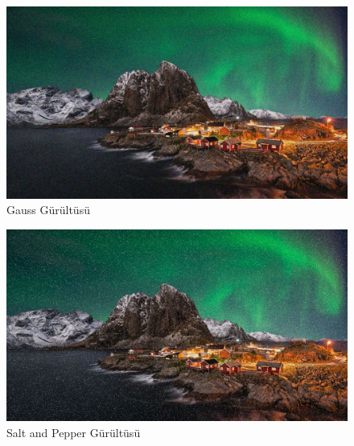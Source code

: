\documentclass{article}
\begin{document}
\begin{figure}
     \centering
 \noindent \includegraphics[angle=360,width=1.1\textwidth]{GaussN.png}\centering 
  \caption{Gauss Gürültüsü}
  \label{fig:resim_etiketi}
\end{figure}


\begin{figure}
     \centering
  \includegraphics[angle=360,width=1.1\textwidth]{SPN.png}\centering 
  \caption{Salt and Pepper Gürültüsü}
  \label{fig:resim_etiketi}
\end{figure}
\end{document}
